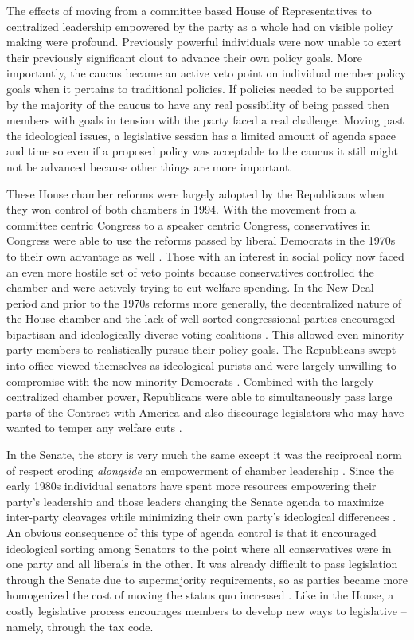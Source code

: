 \documentclass[12pt]{article}
\begin{document}
The effects of moving from a committee based House of Representatives to centralized leadership empowered by the party as a whole had on visible policy making were profound. Previously powerful individuals were now unable to exert their previously significant clout to advance their own policy goals. More importantly, the caucus became an active veto point on individual member policy goals when it pertains to traditional policies. If policies needed to be supported by the majority of the caucus to have any real possibility of being passed then members with goals in tension with the party faced a real challenge. Moving past the ideological issues, a legislative session has a limited amount of agenda space and time so even if a proposed policy was acceptable to the caucus it still might not be advanced because other things are more important.

These House chamber reforms were largely adopted by the Republicans when they won control of both chambers in 1994. With the movement from a committee centric Congress to a speaker centric Congress, conservatives in Congress were able to use the reforms passed by liberal Democrats in the 1970s to their own advantage as well \citep{zelizer2007}. Those with an interest in social policy now faced an even more hostile set of veto points because conservatives controlled the chamber and were actively trying to cut welfare spending. In the New Deal period and prior to the 1970s reforms more generally, the decentralized nature of the House chamber and the lack of well sorted congressional parties encouraged bipartisan and ideologically diverse voting coalitions \citep{poole1997}. This allowed even minority party members to realistically pursue their policy goals. The Republicans swept into office viewed themselves as ideological purists and were largely unwilling to compromise with the now minority Democrats \citep{hacker2006}. Combined with the largely centralized chamber power, Republicans were able to simultaneously pass large parts of the Contract with America and also discourage legislators who may have wanted to temper any welfare cuts \citep{aldrich2000}. 

In the Senate, the story is very much the same except it was the reciprocal norm of respect eroding \emph{alongside} an empowerment of chamber leadership \citep{sinclair1986}. Since the early 1980s individual senators have spent more resources empowering their party's leadership and those leaders changing the Senate agenda to maximize inter-party cleavages while minimizing their own party's ideological differences \citep{lee2008}. An obvious consequence of this type of agenda control is that it encouraged ideological sorting among Senators to the point where all conservatives were in one party and all liberals in the other. It was already difficult to pass legislation through the Senate due to supermajority requirements, so as parties became more homogenized the cost of moving the status quo increased \citep{koger2010}. Like in the House, a costly legislative process encourages members to develop new ways to legislative -- namely, through the tax code.
\end{document}
